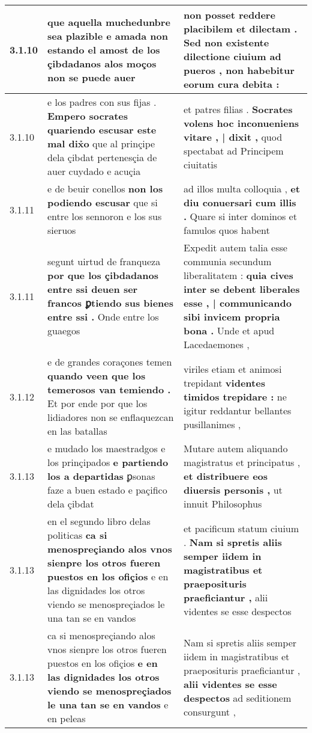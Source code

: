\begin{tabular}{|p{1cm}|p{6.5cm}|p{6.5cm}|}
3.1.10 & que aquella muchedunbre sea plazible \textbf{ e amada non estando el amost de los çibdadanos alos moços } non se puede auer & non posset reddere placibilem et dilectam . \textbf{ Sed non existente dilectione ciuium ad pueros , } non habebitur eorum cura debita : \\\hline
3.1.10 & e los padres con sus fijas . \textbf{ Empero socrates quariendo escusar este mal dix̉o } que al prinçipe dela çibdat pertenesçia de auer cuydado e acuçia & et patres filias . \textbf{ Socrates volens hoc inconueniens vitare , | dixit , } quod spectabat ad Principem ciuitatis \\\hline
3.1.11 & e de beuir conellos \textbf{ non los podiendo escusar } que si entre los sennoron e los sus sieruos & ad illos multa colloquia , \textbf{ et diu conuersari cum illis . } Quare si inter dominos et famulos quos habent \\\hline
3.1.11 & segunt uirtud de franqueza \textbf{ por que los çibdadanos entre ssi deuen ser francos ꝑtiendo sus bienes entre ssi . } Onde entre los guaegos & Expedit autem talia esse communia secundum liberalitatem : \textbf{ quia cives inter se debent liberales esse , | communicando sibi invicem propria bona . } Unde et apud Lacedaemones , \\\hline
3.1.12 & e de grandes coraçones temen \textbf{ quando veen que los temerosos van temiendo . } Et por ende por que los lidiadores non se enflaquezcan en las batallas & viriles etiam et animosi trepidant \textbf{ videntes timidos trepidare : } ne igitur reddantur bellantes pusillanimes , \\\hline
3.1.13 & e mudado los maestradgos e los prinçipados \textbf{ e partiendo los a departidas } ꝑsonas faze a buen estado e paçifico dela çibdat & Mutare autem aliquando magistratus et principatus , \textbf{ et distribuere eos diuersis personis , } ut innuit Philosophus \\\hline
3.1.13 & en el segundo libro delas politicas \textbf{ ca si menospreçiando alos vnos sienpre los otros fueren puestos en los ofiçios } e en las dignidades los otros viendo se menospreçiados le una tan se en vandos & et pacificum statum ciuium . \textbf{ Nam si spretis aliis semper iidem in magistratibus et praeposituris praeficiantur , } alii videntes se esse despectos \\\hline
3.1.13 & ca si menospreçiando alos vnos sienpre los otros fueren puestos en los ofiçios \textbf{ e en las dignidades los otros viendo se menospreçiados le una tan se en vandos } e en peleas & Nam si spretis aliis semper iidem in magistratibus et praeposituris praeficiantur , \textbf{ alii videntes se esse despectos } ad seditionem consurgunt , \\\hline

\end{tabular}
